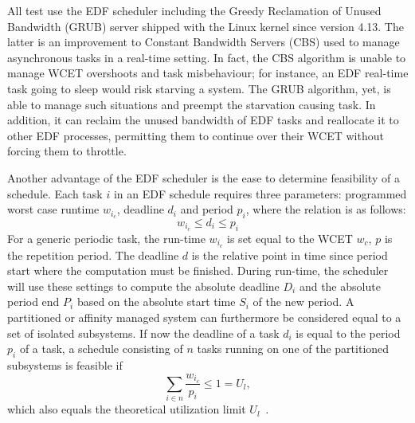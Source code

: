 \documentclass[]{scrartcl}
\begin{document}
All test use the EDF scheduler including the Greedy Reclamation of Unused Bandwidth (GRUB) server shipped with the Linux kernel since version 4.13.
The latter is an improvement to Constant Bandwidth Servers (CBS) used to manage asynchronous tasks in a real-time setting. 
In fact, the CBS algorithm is unable to manage WCET overshoots and task misbehaviour; for instance, an EDF real-time task going to sleep would risk starving a system. 
The GRUB algorithm, yet, is able to manage such situations and preempt the starvation causing task. 
In addition, it can reclaim the unused bandwidth of EDF tasks and reallocate it to other EDF processes, permitting them to continue over their WCET without forcing them to throttle.

Another advantage of the EDF scheduler is the ease to determine feasibility of a schedule.
Each task $i$ in an EDF schedule requires three parameters: programmed worst case runtime $w_{i_c}$, deadline $d_i$ and period $p_i$, where the relation is as follows:
\begin{equation}
w_{i_c} \le d_i \le p_i
\end{equation}
For a generic periodic task, the run-time $w_{i_c}$ is set equal to the WCET $w_c$, $p$ is the repetition period. The deadline $d$ is the relative point in time since period start where the computation must be finished. 
During run-time, the scheduler will use these settings to compute the absolute deadline $D_i$ and the absolute period end $P_i$ based on the absolute start time $S_i$ of the new period.
A partitioned or affinity managed system can furthermore be considered equal to a set of isolated subsystems.
If now the deadline of a task $d_i$ is equal to the period $p_i$ of a task, a schedule consisting of $n$ tasks running on one of the partitioned subsystems is feasible if
\begin{equation}
\sum_{i \in n} \frac{w_{i_c}}{p_i} \le 1 = U_l,
\end{equation}
which also equals the theoretical utilization limit $U_l$~\cite{Buttazzo2011}. 
\end{document}
